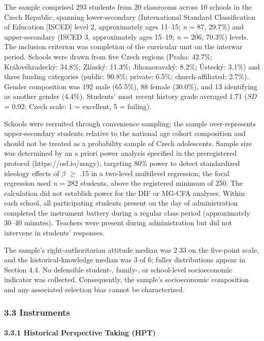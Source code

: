 \documentclass[
  12pt,
]{article}
\newcommand{\Loc}[1]{\linelabel{loc:#1}}
\newcommand{\LocEnd}[1]{\linelabel{loc:#1:end}}
\begin{document}
The sample comprised 293 students from 20 classrooms across 10
schools in the Czech Republic, spanning lower-secondary
(International Standard Classification of Education [ISCED] level 2,
approximately ages 11--15; \emph{n} = 87, 29.7\%) and upper-secondary
(ISCED 3, approximately ages 15--19; \emph{n} = 206, 70.3\%) levels. The inclusion criterion was completion of the curricular unit on the interwar period. Schools were drawn from five Czech regions (Praha: 42.7\%; Královéhradecký: 34.8\%; Zlínský: 11.3\%; Jihomoravský: 8.2\%; Ústecký: 3.1\%) and three funding categories (public: 90.8\%; private: 6.5\%; church-affiliated: 2.7\%). Gender composition was 192 male (65.5\%), 88 female (30.0\%), and 13 identifying as another gender (4.4\%). Students' most recent history grade averaged 1.71 (\emph{SD} = 0.92; Czech scale: 1 = excellent, 5 = failing).

Schools were recruited through convenience sampling; the sample over-represents upper-secondary students relative to the national age cohort composition and should not be treated as a probability sample of Czech adolescents. Sample size was determined by an a priori power analysis specified in the
preregistered protocol (https://osf.io/zsngy), targeting 80\% power to detect standardized ideology effects of \(\beta\) \(\geq\) .15 in a two-level multilevel regression; the focal regression used \emph{n} = 282 students, above the registered minimum of 250. The calculation did not establish power for the DIF or MG-CFA analyses. Within each school, all participating students present on the day of administration completed the instrument battery during a regular class period (approximately 30--40 minutes). Teachers were present during administration but did not intervene in students' responses.

The\Loc{s32-medians} sample's right-authoritarian attitude median was 2.33 on the
five-point scale, and the historical-knowledge median was 3 of 6; fuller
distributions appear in Section 4.4. No defensible student-, family-, or
school-level socioeconomic indicator was collected. Consequently, the sample's
socioeconomic composition and any associated selection bias cannot be
characterized.\LocEnd{s32-medians}

\hypertarget{instruments}{%
\subsubsection{3.3 Instruments}\label{instruments}}

\hypertarget{historical-perspective-taking-hpt}{%
\paragraph{3.3.1 Historical Perspective Taking (HPT)}\label{historical-perspective-taking-hpt}}
\end{document}
